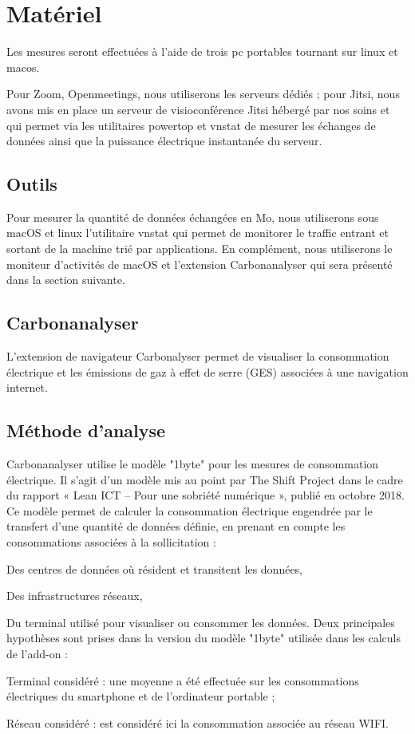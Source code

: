 \documentclass[11pt,a4paper]{article}
\begin{document}
\section{Matériel}
Les mesures seront effectuées à l'aide de trois pc portables tournant sur linux et macos.

Pour Zoom, Openmeetings, nous utiliserons les serveurs dédiés ; pour Jitsi, nous avons mis en place un serveur de visioconférence Jitsi hébergé par nos soins et qui permet via les utilitaires powertop et vnstat de mesurer les échanges de données ainsi que la puissance électrique instantanée du serveur.
\subsection{Outils}
Pour mesurer la quantité de données échangées en Mo, nous utiliserons sous macOS et linux l'utilitaire vnstat qui permet de monitorer le traffic entrant et sortant de la machine trié par applications. En complément, nous utiliserons le moniteur d'activités de macOS et l'extension Carbonanalyser qui sera présenté dans la section suivante.
\subsection{Carbonanalyser}
L’extension de navigateur Carbonalyser permet de visualiser la consommation électrique et les émissions de gaz à effet de serre (GES) associées à une navigation internet.
\subsection*{Méthode d'analyse}
Carbonanalyser utilise le modèle "1byte" pour les mesures de consommation électrique. Il s'agit d'un modèle mis au point par The Shift Project dans le cadre du rapport « Lean ICT – Pour une sobriété numérique », publié en octobre 2018. Ce modèle permet de calculer la consommation électrique engendrée par le transfert d’une quantité de données définie, en prenant en compte les consommations associées à la sollicitation :
\bi \item Des centres de données où résident et transitent les données,
\item Des infrastructures réseaux,
\item Du terminal utilisé pour visualiser ou consommer les données. \ei
Deux principales hypothèses sont prises dans la version du modèle "1byte" utilisée dans les calculs de l’add-on :
\bi \item Terminal considéré : une moyenne a été effectuée sur les consommations électriques du smartphone et de l’ordinateur portable ;
\item Réseau considéré : est considéré ici la consommation associée au réseau WIFI.  \ei
\end{document}
